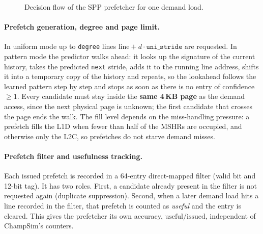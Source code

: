 \documentclass[11pt,a4paper]{article}
\begin{document}
\begin{figure}[H]
    \caption{Decision flow of the SPP prefetcher for one demand load.}
    \label{fig:spp-flow}
\end{figure}

\paragraph{Prefetch generation, degree and page limit.}
In uniform mode up to \texttt{degree} lines $\text{line} + d\cdot\texttt{uni\_stride}$ are requested.
In pattern mode the predictor walks ahead: it looks up the signature of the current history, takes
the predicted \texttt{next} stride, adds it to the running line address, shifts it into a temporary
copy of the history and repeats, so the lookahead follows the learned pattern step by step and stops
as soon as there is no entry of confidence $\ge 1$. Every candidate must stay inside the
\textbf{same 4\,KB page} as the demand access, since the next physical page is unknown; the first
candidate that crosses the page ends the walk. The fill level depends on the miss-handling pressure:
a prefetch fills the L1D when fewer than half of the MSHRs are occupied, and otherwise only
the L2C, so prefetches do not starve demand misses.

\paragraph{Prefetch filter and usefulness tracking.}
Each issued prefetch is recorded in a 64-entry direct-mapped filter (valid bit and 12-bit tag).
It has two roles. First, a candidate already present in the filter is not requested again
(duplicate suppression). Second, when a later demand load hits a line recorded in the filter,
that prefetch is counted as \emph{useful} and the entry is cleared. This gives the prefetcher
its own accuracy, $\text{useful}/\text{issued}$, independent of ChampSim's counters.
\end{document}
